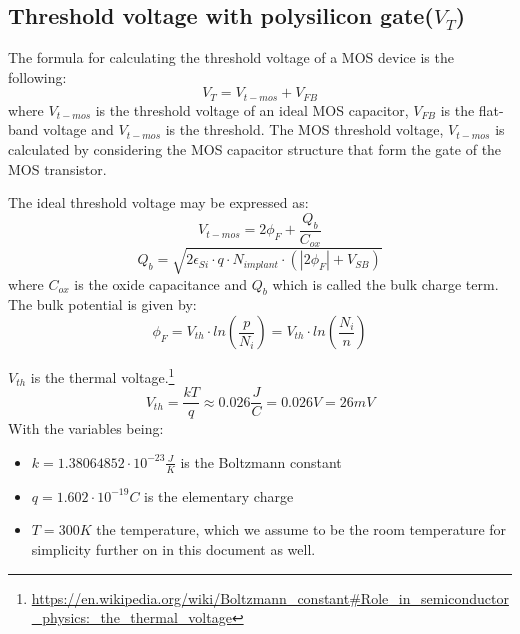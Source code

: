 \subsection{Threshold voltage with polysilicon gate($V_T$)}
The formula for calculating the threshold voltage of a MOS device is the following:
\begin{equation}
V_T = V_{t-mos} + V_{FB}
\end{equation}
where $V_{t-mos}$ is the threshold voltage of an ideal MOS capacitor, $V_{FB}$ is the flat-band voltage and $V_{t-mos}$ is the threshold.
The MOS threshold voltage, $V_{t-mos}$ is calculated by considering the MOS capacitor structure that form the gate of the MOS transistor.

The ideal threshold voltage may be expressed as:
\begin{equation}
V_{t-mos}=2 \phi_F + \frac{Q_b}{C_{ox}}
\end{equation}
\begin{equation}
Q_b
=
\sqrt{2 \epsilon_{Si} \cdot q \cdot N_{implant}  \cdot  ( \left| 2 \phi_F \right| + V_{SB}) }
\end{equation}
where $C_{ox}$ is the oxide capacitance and $Q_b$ which is called the bulk charge term.\\

The bulk potential is given by:
\begin{equation}
\phi_F
=
V_{th} \cdot ln\left(\frac{p}{N_i}\right)
=
V_{th} \cdot ln\left(\frac{N_i}{n}\right)
\end{equation}

$V_{th}$ is the thermal voltage.\footnote{\url{https://en.wikipedia.org/wiki/Boltzmann_constant\#Role_in_semiconductor_physics:_the_thermal_voltage}}
\begin{equation}
V_{th} = \frac{k T}{q} \approx 0.026 \frac{J}{C} = 0.026 V = 26mV
\end{equation}
With the variables being:
\begin{itemize}
\item $k=1.38064852\cdot 10^{-23}  \frac{J}{K}$ is the Boltzmann constant
\item $q=1.602 \cdot 10^{-19} C$ is the elementary charge
\item $T= 300 K$ the temperature, which we assume to be the room temperature for simplicity further on in this document as well.
\end{itemize}

